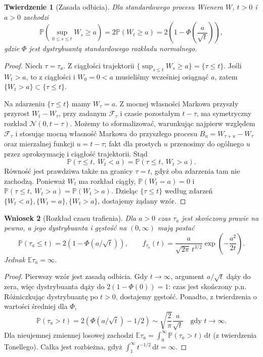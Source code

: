 \documentclass[11pt,a4paper,oneside]{report}
\numberwithin{equation}{chapter}
\theoremstyle{plain}
\newtheorem{twierdzenie}{Twierdzenie}[chapter]
\newtheorem{wniosek}[twierdzenie]{Wniosek}
\theoremstyle{definition}
\theoremstyle{remark}
\newcommand{\Prob}{\mathbb{P}}
\newcommand{\E}{\mathbb{E}}
\newcommand{\calF}{\mathcal{F}}
\newcommand{\dd}{\mathrm{d}}
\newcommand{\Normal}{\mathcal{N}}
\begin{document}
\begin{twierdzenie}[Zasada odbicia]
Dla standardowego procesu Wienera $W$, $t>0$ i $a>0$
zachodzi
\[
\Prob\left(\sup_{0\le s\le t}W_s\ge a\right)
=2\Prob(W_t\ge a)
=2\left(1-\Phi\left(\frac{a}{\sqrt t}\right)\right),
\]
gdzie $\Phi$ jest dystrybuantą standardowego rozkładu normalnego.
\end{twierdzenie}
\begin{proof}
Niech $\tau=\tau_a$. Z ciągłości trajektorii
$\{\sup_{s\le t}W_s\ge a\}=\{\tau\le t\}$.
Jeśli $W_t>a$, to z ciągłości i $W_0=0<a$ musieliśmy
wcześniej osiągnąć $a$, zatem $\{W_t>a\}\subset\{\tau\le t\}$.

Na zdarzeniu $\{\tau\le t\}$ mamy $W_\tau=a$.
Z mocnej własności Markowa przyszły przyrost
$W_t-W_\tau$, przy zadanym $\calF_\tau$ i czasie
pozostałym $t-\tau$, ma symetryczny rozkład
$\Normal(0,t-\tau)$. Możemy to sformalizować,
warunkując najpierw względem $\calF_\tau$ i stosując
mocną własność Markowa do przyszłego procesu
$B_u=W_{\tau+u}-W_\tau$ oraz mierzalnej funkcji
$u=t-\tau$; fakt dla prostych $u$ przenosimy do
ogólnego $u$ przez aproksymację i ciągłość trajektorii.
Stąd
\[
\Prob(\tau\le t,\ W_t<a)
=\Prob(\tau\le t,\ W_t>a).
\]
Równość jest prawdziwa także na granicy $\tau=t$,
gdyż oba zdarzenia tam nie zachodzą.
Ponieważ $W_t$ ma rozkład ciągły,
$\Prob(W_t=a)=0$ i
$\Prob(\tau\le t,\ W_t>a)=\Prob(W_t>a)$.
Dzieląc $\{\tau\le t\}$ według zdarzeń
$\{W_t<a\},\{W_t=a\},\{W_t>a\}$,
dostajemy żądany wzór.
\end{proof}

\begin{wniosek}[Rozkład czasu trafienia]
Dla $a>0$ czas $\tau_a$ jest skończony prawie na pewno,
a jego dystrybuanta i gęstość na $(0,\infty)$ mają postać
\[
\Prob(\tau_a\le t)=2\left(1-\Phi(a/\sqrt t)\right),
\qquad
f_{\tau_a}(t)=\frac{a}{\sqrt{2\pi}\,t^{3/2}}
\exp\left(-\frac{a^2}{2t}\right).
\]
Jednak $\E\tau_a=\infty$.
\end{wniosek}
\begin{proof}
Pierwszy wzór jest zasadą odbicia. Gdy $t\to\infty$,
argument $a/\sqrt t$ dąży do zera, więc dystrybuanta
dąży do $2(1-\Phi(0))=1$: czas jest skończony p.n.
Różniczkując dystrybuantę po $t>0$, dostajemy gęstość.
Ponadto, z twierdzenia o wartości średniej dla $\Phi$,
\[
\Prob(\tau_a>t)=2(\Phi(a/\sqrt t)-1/2)
\sim \sqrt{\frac2\pi}\frac{a}{\sqrt t}
\quad\text{gdy }t\to\infty.
\]
Dla nieujemnej zmiennej losowej zachodzi
$\E\tau_a=\int_0^\infty\Prob(\tau_a>t)\,\dd t$
(z twierdzenia Tonellego). Całka jest rozbieżna,
gdyż $\int_1^\infty t^{-1/2}\,\dd t=\infty$.
\end{proof}
\end{document}
